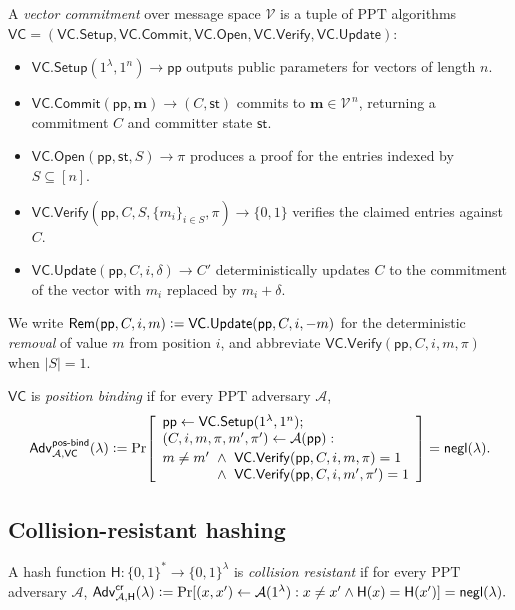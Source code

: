 \documentclass[version=preprint]{iacrcc}
\theoremstyle{definition}
\newcommand{\secpar}{\lambda}
\newcommand{\negl}{\mathsf{negl}}
\newcommand{\PPT}{\mathrm{PPT}}
\newcommand{\bit}{\{0,1\}}
\newcommand{\defeq}{\vcentcolon=}
\newcommand{\Setup}{\mathsf{Setup}}
\newcommand{\Commit}{\mathsf{Commit}}
\newcommand{\Open}{\mathsf{Open}}
\newcommand{\Vfy}{\mathsf{Verify}}
\newcommand{\Update}{\mathsf{Update}}
\newcommand{\Rem}{\mathsf{Rem}}
\newcommand{\pp}{\mathsf{pp}}
\newcommand{\aux}{\mathsf{st}}
\newcommand{\Adv}{\mathsf{Adv}}
\newcommand{\A}{\mathcal{A}}
\newcommand{\Vsp}{\mathcal{V}}
\newcommand{\hash}{\mathsf{H}}
\newcommand{\VC}{\mathsf{VC}}
\newcommand{\posbind}{\mathsf{pos\text{-}bind}}
\newcommand{\collres}{\mathsf{cr}}
\begin{document}
\begin{definition}\label{def:vc}
A \emph{vector commitment} over message space $\Vsp$ is a tuple of $\PPT$
algorithms $\VC=(\VC.\Setup,\VC.\Commit,\VC.\Open,\VC.\Vfy,\VC.\Update)$:
\begin{itemize}[leftmargin=1.4em,itemsep=2pt]
  \item $\VC.\Setup(1^\secpar,1^n)\to\pp$ outputs public parameters for vectors
        of length $n$.
  \item $\VC.\Commit(\pp,\mathbf{m})\to(C,\aux)$ commits to
        $\mathbf{m}\in\Vsp^{\,n}$, returning a commitment $C$ and committer state
        $\aux$.
  \item $\VC.\Open(\pp,\aux,S)\to\pi$ produces a proof for the entries indexed by
        $S\subseteq[n]$.
  \item $\VC.\Vfy(\pp,C,S,\{m_i\}_{i\in S},\pi)\to\bit$ verifies the claimed
        entries against $C$.
  \item $\VC.\Update(\pp,C,i,\delta)\to C'$ deterministically updates $C$ to the
        commitment of the vector with $m_i$ replaced by $m_i+\delta$.
\end{itemize}
We write $\Rem(\pp,C,i,m)\defeq\VC.\Update(\pp,C,i,-m)$ for the deterministic
\emph{removal} of value $m$ from position $i$, and abbreviate
$\VC.\Vfy(\pp,C,i,m,\pi)$ when $|S|=1$.
\end{definition}

\begin{definition}\label{def:posbind}
$\VC$ is \emph{position binding} if for every $\PPT$ adversary $\A$,
\[
  \Adv^{\posbind}_{\A,\VC}(\secpar)\defeq
  \Pr\!\left[
    \begin{array}{l}
      \pp\leftarrow\VC.\Setup(1^\secpar,1^n);\\
      (C,i,m,\pi,m',\pi')\leftarrow\A(\pp):\\[2pt]
      m\neq m'\ \wedge\ \VC.\Vfy(\pp,C,i,m,\pi)=1\\
      \hphantom{m\neq m'}\ \wedge\ \VC.\Vfy(\pp,C,i,m',\pi')=1
    \end{array}
  \right]=\negl(\secpar).
\]
\end{definition}

\subsection{Collision-resistant hashing}

\begin{definition}[CRHF]\label{def:crhf}
A hash function $\hash:\bit^{*}\to\bit^{\secpar}$ is \emph{collision resistant}
if for every $\PPT$ adversary $\A$,
$\Adv^{\collres}_{\A,\hash}(\secpar)\defeq
 \Pr[(x,x')\leftarrow\A(1^\secpar):x\neq x'\wedge\hash(x)=\hash(x')]
 =\negl(\secpar).$
\end{definition}
\end{document}
